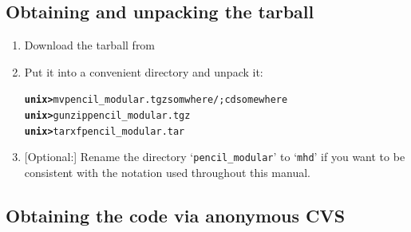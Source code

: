 \documentclass[12pt,twoside,notitlepage,a4paper]{article}
\newcommand{\prompt}[1]{{\ttfamily\bfseries{}#1}}
\newcommand{\file}[1]{`\texttt{#1}'}
\begin{document}

\subsection{Obtaining and unpacking the tarball}

\begin{enumerate}
\item Download the tarball from
\item Put it into a convenient directory and unpack it:
  \begin{alltt}
  \prompt{unix> } mv pencil_modular.tgz somwhere/; cd somewhere
  \prompt{unix> } gunzip pencil_modular.tgz
  \prompt{unix> } tar xf pencil_modular.tar \
  \end{alltt}
\item {}[Optional:] Rename the directory \file{pencil_modular} to \file{mhd}
  if you want to be consistent with the notation used throughout this
  manual.
\end{enumerate}


\subsection{Obtaining the code via anonymous CVS}
\end{document}
